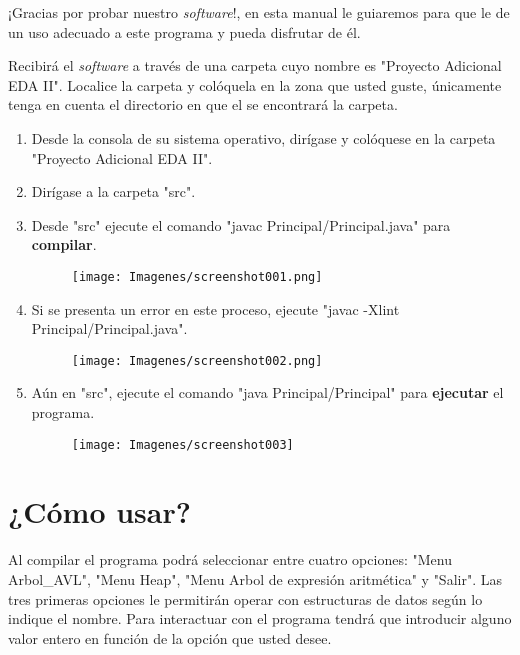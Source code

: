\documentclass[letterpaper, 11pt]{article}
\begin{document}
	¡Gracias por probar nuestro \textit{software}!, en esta manual le guiaremos para que le de un uso adecuado a este programa y pueda disfrutar de él.
	
	Recibirá el \textit{software} a través de una carpeta cuyo nombre es "Proyecto Adicional EDA II". Localice la carpeta y colóquela en la zona que usted guste, únicamente tenga en cuenta el directorio en que el se encontrará la carpeta.
	
	\begin{enumerate}
		\item Desde la consola de su sistema operativo, dirígase y colóquese en la carpeta "Proyecto Adicional EDA II".
		\item Dirígase a la carpeta "src".
		\item Desde "src" ejecute el comando "javac Principal/Principal.java" para \textbf{compilar}. 
		
		\begin{figure}[H]
			\centering
			\texttt{[image: Imagenes/screenshot001.png]}
		\end{figure}
		
		\item[] Si se presenta un error en este proceso, ejecute "javac -Xlint Principal/Principal.java".
		
		\begin{figure}[H]
			\centering
			\texttt{[image: Imagenes/screenshot002.png]}
		\end{figure}
		
		\item Aún en "src", ejecute el comando "java Principal/Principal" para \textbf{ejecutar} el programa.
		
		\begin{figure}[H]
			\centering
			\texttt{[image: Imagenes/screenshot003]}
		\end{figure}
	\end{enumerate}
	
	\section{¿Cómo usar?}
	
	Al compilar el programa podrá seleccionar entre cuatro opciones: "Menu Arbol\_AVL", "Menu Heap", "Menu Arbol de expresión aritmética" y "Salir". Las tres primeras opciones le permitirán operar con estructuras de datos según lo indique el nombre. Para interactuar con el programa tendrá que introducir alguno valor entero en función de la opción que usted desee. 
	
\end{document}
